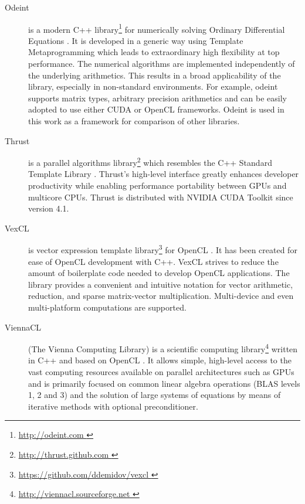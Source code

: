 \documentclass[1p]{elsarticle}
\begin{document}

\begin{description}
    \item[Odeint] is a modern C++ library\footnote{ \href{ http://odeint.com }{
	http://odeint.com } } for numerically solving Ordinary Differential
	Equations \cite{OdeintRef1, OdeintRef2}. It is developed in a generic
	way using Template Metaprogramming which leads to extraordinary high
	flexibility at top performance. The numerical algorithms are
	implemented independently of the underlying arithmetics.  This results
	in a broad applicability of the library, especially in non-standard
	environments.  For example, odeint supports matrix types, arbitrary
	precision arithmetics and can be easily adopted to use either CUDA or
	OpenCL frameworks.  Odeint is used in this work as a framework for
	comparison of other libraries.
    \item[Thrust] is a parallel algorithms library\footnote{ \href{
	http://thrust.github.com }{ http://thrust.github.com }} which resembles
	the C++ Standard Template Library \cite{ThrustRef}.  Thrust's
	high-level interface greatly enhances developer productivity while
	enabling performance portability between GPUs and multicore CPUs.
	Thrust is distributed with NVIDIA CUDA Toolkit since version 4.1.
    \item[VexCL] is vector expression template
	library\footnote{ \href{ https://github.com/ddemidov/vexcl }{
	https://github.com/ddemidov/vexcl }} for OpenCL \cite{VexCLRef}. It has
	been created for ease of OpenCL development with C++.  VexCL strives to
	reduce the amount of boilerplate code needed to develop OpenCL
	applications. The library provides a convenient and intuitive notation
	for vector arithmetic, reduction, and sparse matrix-vector
	multiplication.  Multi-device and even multi-platform computations are
	supported.
    \item[ViennaCL] (The Vienna Computing Library) is a scientific computing
	library\footnote{ \href{ http://viennacl.sourceforge.net }{
	http://viennacl.sourceforge.net }} written in C++ and based on OpenCL
	\cite{ViennaCLRef}. It allows simple, high-level access to the vast
	computing resources available on parallel architectures such as GPUs
	and is primarily focused on common linear algebra operations (BLAS
	levels 1, 2 and 3) and the solution of large systems of equations by
	means of iterative methods with optional preconditioner.
\end{description}
\end{document}
